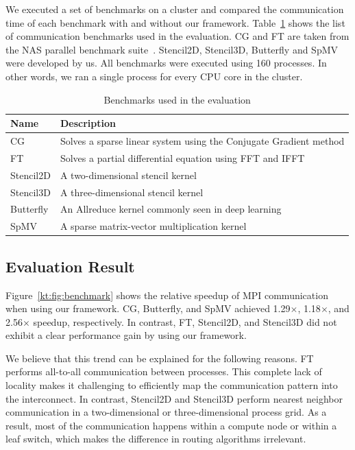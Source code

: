 \documentclass[graybox]{svmult}
\begin{document}
We executed a set of benchmarks on a cluster and compared the communication
time of each benchmark with and without our framework.
Table~\ref{kt:tbl:miniapps} shows the list of communication benchmarks used in
the evaluation. CG and FT are taken from the NAS parallel benchmark
suite~\cite{Bailey1991}. Stencil2D, Stencil3D, Butterfly and SpMV were
developed by us. All benchmarks were executed using 160 processes. In other
words, we ran a single process for every CPU core in the cluster.

\begin{table}
\caption{Benchmarks used in the evaluation}%
\label{kt:tbl:miniapps}
\begin{tabular}{ll}
\toprule
Name      & Description \\ \midrule
CG        & Solves a sparse linear system using the Conjugate Gradient method \\
FT        & Solves a partial differential equation using FFT and IFFT         \\
Stencil2D & A two-dimensional stencil kernel                                  \\
Stencil3D & A three-dimensional stencil kernel                                \\
Butterfly & An Allreduce kernel commonly seen in deep learning                \\
SpMV      & A sparse matrix-vector multiplication kernel                      \\ \bottomrule
\end{tabular}
\end{table}

\subsection{Evaluation Result}

Figure~\ref{kt:fig:benchmark} shows the relative speedup of MPI communication
when using our framework. CG, Butterfly, and SpMV achieved 1.29$\times$,
1.18$\times$, and 2.56$\times$ speedup, respectively. In contrast, FT,
Stencil2D, and Stencil3D did not exhibit a clear performance gain by using our
framework.

We believe that this trend can be explained for the following reasons. FT
performs all-to-all communication between processes. This complete lack of
locality makes it challenging to efficiently map the communication pattern
into the interconnect. In contrast, Stencil2D and Stencil3D perform nearest
neighbor communication in a two-dimensional or three-dimensional process grid.
As a result, most of the communication happens within a compute node or within
a leaf switch, which makes the difference in routing algorithms irrelevant.
\end{document}
